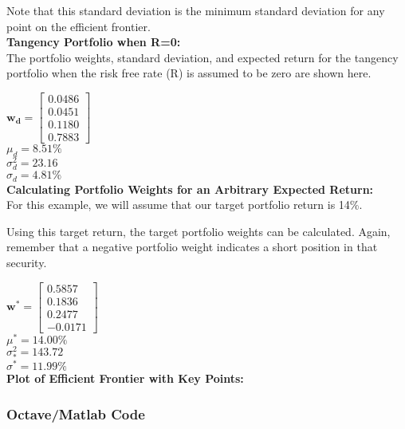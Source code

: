 \documentclass[12pt,a4paper]{article}
\begin{document}
Note that this standard deviation is the minimum standard deviation for any point on the efficient frontier.\\

\textbf{Tangency Portfolio when R=0:}\\
The portfolio weights, standard deviation, and expected return for the tangency portfolio when the risk free rate (R) is assumed to be zero are shown here.

$\mathbf{w_{d}}=\begin{bmatrix} 0.0486\\ 0.0451\\ 0.1180\\ 0.7883 \end{bmatrix}$\\

$\mu_{d}=8.51\%$\\

$\sigma^{2}_{d}=23.16$\\

$\sigma_{d}=4.81\%$\\

\textbf{Calculating Portfolio Weights for an Arbitrary Expected Return:}\\
For this example, we will assume that our target portfolio return is 14\%.

Using this target return, the target portfolio weights can be calculated. Again, remember that a negative portfolio weight indicates a short position in that security.

$\mathbf{w^{*}}=\begin{bmatrix} 0.5857\\ 0.1836\\ 0.2477\\ -0.0171 \end{bmatrix}$\\

$\mu^{*}=14.00\%$\\

$\sigma_{*}^{2}=143.72$\\

$\sigma^{*}=11.99\%$\\

\textbf{Plot of Efficient Frontier with Key Points:}
~\\


\subsubsection{Octave/Matlab Code}
\end{document}

